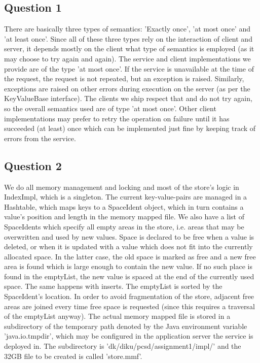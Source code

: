 \documentclass[12pt,a4paper]{article}
\newcommand{\code}[1]{{\fontfamily{fvm}\small \selectfont #1}}
\begin{document}
\subsection*{Question 1}
\label{sec:pq1}
There are basically three types of semantics: 'Exactly once', 'at most once' and 'at least once'. Since all of these three types rely on the interaction of client and server, it depends mostly on the client what type of semantics is employed (as it may choose to try again and again). The service and client implementations we provide are of the type 'at most once'. If the service is unavailable at the time of the request, the request is not repeated, but an exception is raised. Similarly, exceptions are raised on other errors during execution on the server (as per the \code{KeyValueBase} interface). The clients we ship respect that and do not try again, so the overall semantics used are of type 'at most once'. Other client implementations may prefer to retry the operation on failure until it has succeeded (at least) once which can be implemented just fine by keeping track of errors from the service.

\subsection*{Question 2}
\label{sec:pq2}

We do all memory management and locking and most of the store's logic in IndexImpl, which is a singleton. The current key-value-pairs are managed in a Hashtable, which maps keys to a SpaceIdent object, which in turn contains a value's position and length in the memory mapped file. We also have a list of SpaceIdents which specify all empty areas in the store, i.e. areas that may be overwritten and used by new values. Space is declared to be free when a value is deleted, or when it is updated with a value which does not fit into the currently allocated space. In the latter case, the old space is marked as free and a new free area is found which is large enough to contain the new value. If no such place is found in the emptyList, the new value is spaced at the end of the currently used space. The same happens with inserts. The emptyList is sorted by the SpaceIdent's location. In order to avoid fragmentation of the store, adjacent free areas are joined every time free space is requested (since this requires a traversal of the emptyList anyway). The actual memory mapped file is stored in a subdirectory of the temporary path denoted by the Java environment variable 'java.io.tmpdir', which may be configured in the application server the service is deployed in. The subdirectory is 'dk/diku/pcsd/assignment1/impl/' and the 32GB file to be created is called 'store.mmf'.
\end{document}
